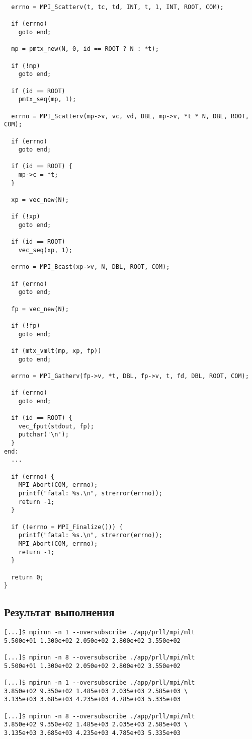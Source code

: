 \documentclass[12pt, a4paper]{article}
\begin{document}
\begin{verbatim}
  errno = MPI_Scatterv(t, tc, td, INT, t, 1, INT, ROOT, COM);

  if (errno)
    goto end;

  mp = pmtx_new(N, 0, id == ROOT ? N : *t);

  if (!mp)
    goto end;

  if (id == ROOT)
    pmtx_seq(mp, 1);

  errno = MPI_Scatterv(mp->v, vc, vd, DBL, mp->v, *t * N, DBL, ROOT, COM);

  if (errno)
    goto end;

  if (id == ROOT) {
    mp->c = *t;
  }

  xp = vec_new(N);

  if (!xp)
    goto end;

  if (id == ROOT)
    vec_seq(xp, 1);

  errno = MPI_Bcast(xp->v, N, DBL, ROOT, COM);

  if (errno)
    goto end;

  fp = vec_new(N);

  if (!fp)
    goto end;

  if (mtx_vmlt(mp, xp, fp))
    goto end;

  errno = MPI_Gatherv(fp->v, *t, DBL, fp->v, t, fd, DBL, ROOT, COM);

  if (errno)
    goto end;

  if (id == ROOT) {
    vec_fput(stdout, fp);
    putchar('\n');
  }
end:
  ...

  if (errno) {
    MPI_Abort(COM, errno);
    printf("fatal: %s.\n", strerror(errno));
    return -1;
  }

  if ((errno = MPI_Finalize())) {
    printf("fatal: %s.\n", strerror(errno));
    MPI_Abort(COM, errno);
    return -1;
  }

  return 0;
}
\end{verbatim}

\subsection{Результат выполнения}

\begin{verbatim}
[...]$ mpirun -n 1 --oversubscribe ./app/prll/mpi/mlt
5.500e+01 1.300e+02 2.050e+02 2.800e+02 3.550e+02

[...]$ mpirun -n 8 --oversubscribe ./app/prll/mpi/mlt
5.500e+01 1.300e+02 2.050e+02 2.800e+02 3.550e+02

[...]$ mpirun -n 1 --oversubscribe ./app/prll/mpi/mlt
3.850e+02 9.350e+02 1.485e+03 2.035e+03 2.585e+03 \
3.135e+03 3.685e+03 4.235e+03 4.785e+03 5.335e+03

[...]$ mpirun -n 8 --oversubscribe ./app/prll/mpi/mlt
3.850e+02 9.350e+02 1.485e+03 2.035e+03 2.585e+03 \
3.135e+03 3.685e+03 4.235e+03 4.785e+03 5.335e+03
\end{verbatim}
\end{document}

